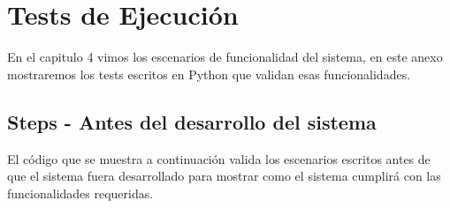 
\chapter{Tests de Ejecución}

\newpage

En el capitulo 4 vimos los escenarios de funcionalidad del sistema, en este
anexo mostraremos los tests escritos en Python que validan esas funcionalidades.

\section{Steps - Antes del desarrollo del sistema}
El código que se muestra a continuación valida los escenarios escritos antes
de que el sistema fuera desarrollado para mostrar como el sistema cumplirá con
las funcionalidades requeridas.

